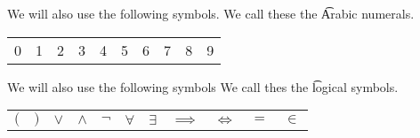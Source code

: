 
We will also use the following symbols.
We call these the \t{Arabic numerals}.
\begin{center}
\begin{tabular}{cccccccccc}
  0 & 1 & 2 & 3 & 4 & 5 & 6 & 7 & 8 & 9\\
\end{tabular}
\end{center}


We will also use the following symbols
We call thes the \t{logical symbols}.
\begin{center}
\begin{tabular}{ccccccccccc}
  $($ & $)$ & $\lor$ & $\land$ & $\neg$ & $\forall$ & $\exists$ & $\implies$ & $\iff$ & $=$ & $\in$
\end{tabular}
\end{center}







